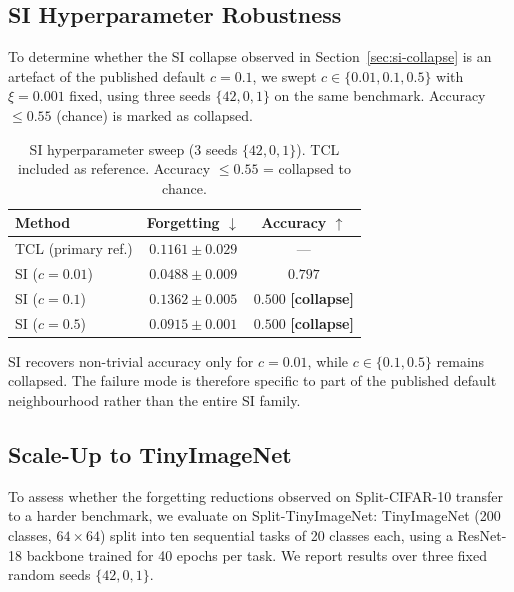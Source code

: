 \documentclass[10pt,a4paper]{article}
\begin{document}
\subsection{SI Hyperparameter Robustness}
\label{sec:si-robustness}

To determine whether the SI collapse observed in Section~\ref{sec:si-collapse} is
an artefact of the published default $c = 0.1$, we swept $c \in \{0.01, 0.1, 0.5\}$
with $\xi = 0.001$ fixed, using three seeds $\{42, 0, 1\}$ on the same benchmark.
Accuracy $\leq 0.55$ (chance) is marked as collapsed.

\begin{table}[h]
\centering
\caption{SI hyperparameter sweep (3 seeds $\{42, 0, 1\}$). TCL included as reference.
Accuracy $\leq 0.55$ = collapsed to chance.}
\label{tab:si-sweep}
\begin{tabular}{lcc}
\toprule
Method & Forgetting $\downarrow$ & Accuracy $\uparrow$ \\
\midrule
TCL (primary ref.) & $0.1161 \pm 0.029$ & --- \\
SI ($c=0.01$) & $0.0488 \pm 0.009$ & $0.797$  \\
SI ($c=0.1$) & $0.1362 \pm 0.005$ & $0.500$ \textbf{[collapse]} \\
SI ($c=0.5$) & $0.0915 \pm 0.001$ & $0.500$ \textbf{[collapse]} \\
\bottomrule
\end{tabular}
\end{table}

SI recovers non-trivial accuracy only for $c=0.01$, while $c \in \{0.1, 0.5\}$
remains collapsed. The failure mode is therefore specific to part of the
published default neighbourhood rather than the entire SI family.

\subsection{Scale-Up to TinyImageNet}
\label{sec:tinyimagenet}

To assess whether the forgetting reductions observed on Split-CIFAR-10 transfer
to a harder benchmark, we evaluate on Split-TinyImageNet: TinyImageNet
(200 classes, $64\times64$) split into ten sequential tasks of 20 classes each,
using a ResNet-18 backbone trained for 40 epochs per task.
We report results over three fixed random seeds $\{42, 0, 1\}$.
\end{document}

